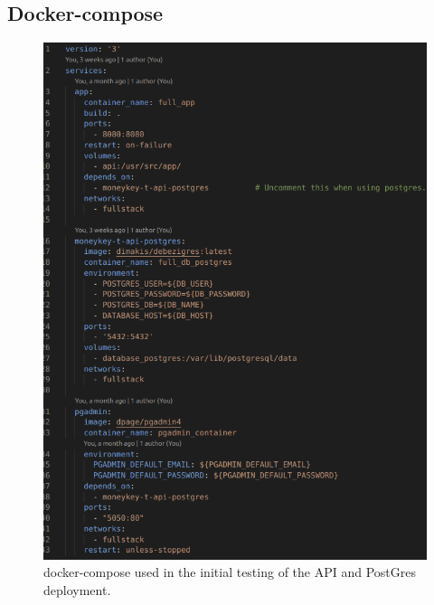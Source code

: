 \begin{flushleft}
	\subsection{Docker-compose}
    \begin{figure} [ht]
        \begin{center}
            \includegraphics[width=.7\textwidth]{figures/docker-compose.png}
            \caption{docker-compose used in the initial testing of the API and PostGres deployment.}
            \label{fig: A.2}
        \end{center}
    \end{figure}
\end{flushleft}